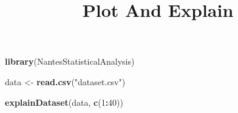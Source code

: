 \documentclass[]{article}
\title{Plot And Explain}
\author{}
\date{}
\newenvironment{Shaded}{\begin{snugshade}}{\end{snugshade}}
\newcommand{\DecValTok}[1]{\textcolor[rgb]{0.00,0.00,0.81}{#1}}
\newcommand{\KeywordTok}[1]{\textcolor[rgb]{0.13,0.29,0.53}{\textbf{#1}}}
\newcommand{\NormalTok}[1]{#1}
\newcommand{\OperatorTok}[1]{\textcolor[rgb]{0.81,0.36,0.00}{\textbf{#1}}}
\newcommand{\StringTok}[1]{\textcolor[rgb]{0.31,0.60,0.02}{#1}}
\begin{document}
\maketitle

\begin{Shaded}
\begin{Highlighting}[]
\KeywordTok{library}\NormalTok{(NantesStatisticalAnalysis)}
\end{Highlighting}
\end{Shaded}

\begin{Shaded}
\begin{Highlighting}[]
\NormalTok{data <-}\StringTok{ }\KeywordTok{read.csv}\NormalTok{(}\StringTok{"dataset.csv"}\NormalTok{)}
\end{Highlighting}
\end{Shaded}

\begin{Shaded}
\begin{Highlighting}[]
\KeywordTok{explainDataset}\NormalTok{(data, }\KeywordTok{c}\NormalTok{(}\DecValTok{1}\OperatorTok{:}\DecValTok{40}\NormalTok{))}
\end{Highlighting}
\end{Shaded}
\end{document}

